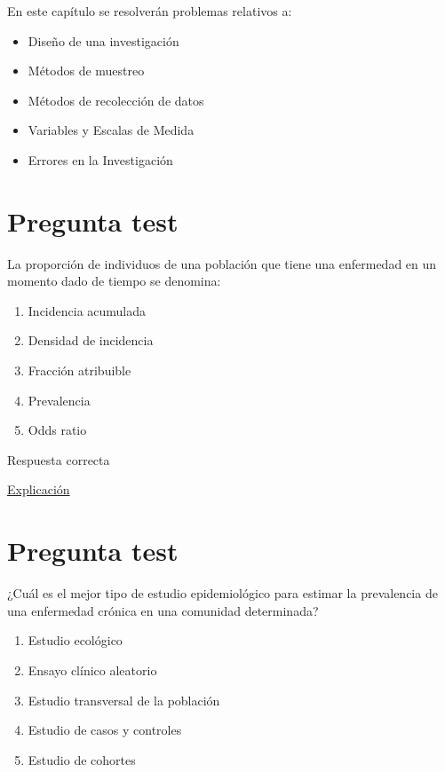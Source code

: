 \documentclass[
]{book}
\providecommand{\tightlist}{%
  \setlength{\itemsep}{0pt}\setlength{\parskip}{0pt}}
\begin{document}
En este capítulo se resolverán problemas relativos a:

\begin{itemize}
\tightlist
\item
  Diseño de una investigación
\item
  Métodos de muestreo
\item
  Métodos de recolección de datos
\item
  Variables y Escalas de Medida
\item
  Errores en la Investigación
\end{itemize}

\hypertarget{pregunta-test}{%
\section{Pregunta test}\label{pregunta-test}}

La proporción de individuos de una población que tiene una enfermedad en un momento dado de tiempo se denomina:

\begin{enumerate}
\def\labelenumi{\alph{enumi})}
\tightlist
\item
  Incidencia acumulada
\item
  Densidad de incidencia
\item
  Fracción atribuible
\item
  Prevalencia
\item
  Odds ratio
\end{enumerate}

Respuesta correcta

\href{https://www.cancer.gov/espanol/publicaciones/diccionarios/diccionario-cancer/def/prevalencia}{Explicación}

\hypertarget{pregunta-test-1}{%
\section{Pregunta test}\label{pregunta-test-1}}

¿Cuál es el mejor tipo de estudio epidemiológico para estimar la prevalencia de una enfermedad crónica en una comunidad determinada?

\begin{enumerate}
\def\labelenumi{\alph{enumi})}
\tightlist
\item
  Estudio ecológico
\item
  Ensayo clínico aleatorio
\item
  Estudio transversal de la población
\item
  Estudio de casos y controles
\item
  Estudio de cohortes
\end{enumerate}
\end{document}
